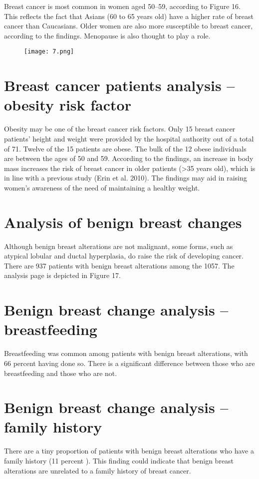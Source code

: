 \documentclass[10pt,a4paper,twoside]{article}
\begin{document}
Breast cancer is most common in women aged 50–59, according to Figure 16. This reflects the fact that Asians (60 to 65 years old) have a higher rate of breast cancer than Caucasians.
Older women are also more susceptible to breast cancer, according to the findings. Menopause is also thought to play a role.

\begin{figure}
  \texttt{[image: 7.png]}
  
  
  
\end{figure}
\section{Breast cancer patients analysis – obesity risk factor}

Obesity may be one of the breast cancer risk factors.
Only 15 breast cancer patients' height and weight were provided by the hospital authority out of a total of 71. Twelve of the 15 patients are obese. The bulk of the 12 obese individuals are between the ages of 50 and 59. According to the findings, an increase in body mass increases the risk of breast cancer in older patients (>35 years old), which is in line with a previous study (Erin et al. 2010). The findings may aid in raising women's awareness of the need of maintaining a healthy weight.
\section{Analysis of benign breast changes}
Although benign breast alterations are not malignant, some forms, such as atypical lobular and ductal hyperplasia, do raise the risk of developing cancer. There are 937 patients with benign breast alterations among the 1057. The analysis page is depicted in Figure 17.

\section{Benign breast change analysis – breastfeeding}
Breastfeeding was common among patients with benign breast alterations, with 66 percent having done so. There is a significant difference between those who are breastfeeding and those who are not.
\section{Benign breast change analysis – family history}
There are a tiny proportion of patients with benign breast alterations who have a family history (11 percent ). This finding could indicate that benign breast alterations are unrelated to a family history of breast cancer.
\end{document}
